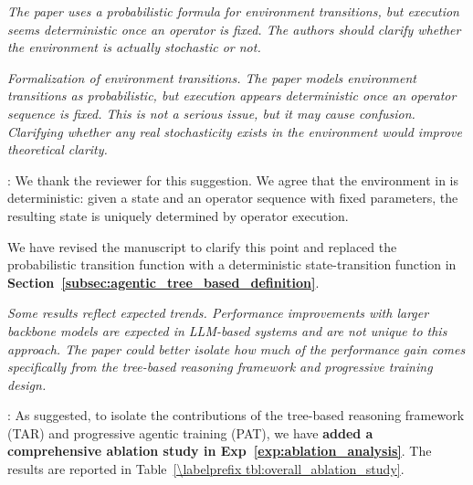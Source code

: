 \begin{shaded}
{
\emph{The paper uses a probabilistic formula for environment transitions, but execution seems deterministic once an operator is fixed. The authors should clarify whether the environment is actually stochastic or not.}

\emph{Formalization of environment transitions.
The paper models environment transitions as probabilistic, but execution appears deterministic once an operator sequence is fixed. This is not a serious issue, but it may cause confusion. Clarifying whether any real stochasticity exists in the environment would improve theoretical clarity.}
}
\end{shaded}


:
We thank the reviewer for this suggestion.
We agree that the environment in \sys is deterministic: given a state and an operator sequence with fixed parameters, the resulting state is uniquely determined by operator execution. 

We have revised the manuscript to clarify this point and replaced the probabilistic transition function with a deterministic state-transition function in {\textbf{Section~\ref{subsec:agentic_tree_based_definition}}}.

%

\begin{shaded}
{
\emph{Some results reflect expected trends.
Performance improvements with larger backbone models are expected in LLM-based systems and are not unique to this approach. The paper could better isolate how much of the performance gain comes specifically from the tree-based reasoning framework and progressive training design.}
}
\end{shaded}



: 
As suggested, to isolate the contributions of the tree-based reasoning framework (TAR) and progressive agentic training (PAT), we have \textbf{added a comprehensive ablation study in Exp~\ref{exp:ablation_analysis}}. The results are reported in Table~\ref{\labelprefix tbl:overall_ablation_study}.

